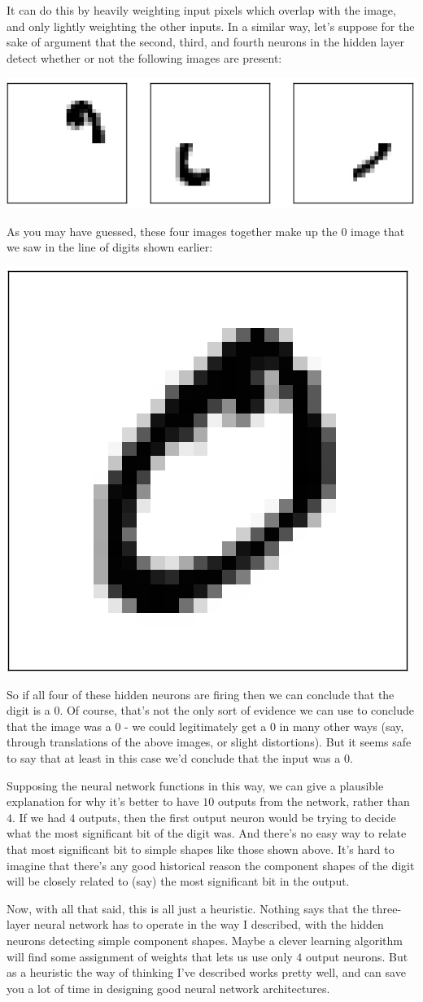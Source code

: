 \documentclass[a4paper,12pt]{report}%
\begin{document}
It can do this by heavily weighting input pixels which overlap with the image, and only lightly weighting the other inputs. In a similar way, let's suppose for the sake of argument that the second, third, and fourth neurons in the hidden layer detect whether or not the following images are present:
\begin{center}
 \includegraphics[width=0.5\linewidth]{images/mnist_other_features.png}
\end{center}

As you may have guessed, these four images together make up the $0$ image that we saw in the line of digits shown earlier:
\begin{center}
 \includegraphics[width=0.15\linewidth]{images/mnist_complete_zero.png}
\end{center}

So if all four of these hidden neurons are firing then we can conclude that the digit is a $0$. Of course, that's not the only sort of evidence we can use to conclude that the image was a $0$ - we could legitimately get a $0$ in many other ways (say, through translations of the above images, or slight distortions). But it seems safe to say that at least in this case we'd conclude that the input was a $0$.

Supposing the neural network functions in this way, we can give a plausible explanation for why it's better to have $10$ outputs from the network, rather than $4$. If we had $4$ outputs, then the first output neuron would be trying to decide what the most significant bit of the digit was. And there's no easy way to relate that most significant bit to simple shapes like those shown above. It's hard to imagine that there's any good historical reason the component shapes of the digit will be closely related to (say) the most significant bit in the output.

Now, with all that said, this is all just a heuristic. Nothing says that the three-layer neural network has to operate in the way I described, with the hidden neurons detecting simple component shapes. Maybe a clever learning algorithm will find some assignment of weights that lets us use only $4$ output neurons. But as a heuristic the way of thinking I've described works pretty well, and can save you a lot of time in designing good neural network architectures.
\end{document}
